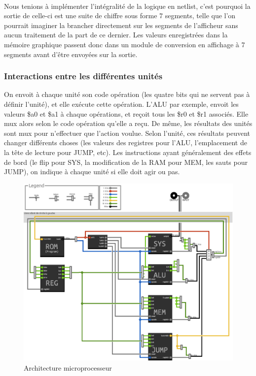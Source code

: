 \documentclass{article}
\begin{document}
\paragraph{}
Nous tenions à implémenter l'intégralité de la logique en netlist, c'est pourquoi
la sortie de celle-ci est une suite de chiffre sous forme 7 segments, telle que l'on
pourrait imaginer la brancher directement sur les segments de l'afficheur sans
aucun traitement de la part de ce dernier. Les valeurs enregistrées dans la mémoire
graphique passent donc dans un module de conversion en affichage à 7 segments avant
d'être envoyées sur la sortie.


\subsubsection{Interactions entre les différentes unités}

On envoit à chaque unité son code opération (les quatre bits qui ne servent pas
à définir l'unité), et elle exécute cette opération. L'ALU par exemple, envoit
les valeurs \$a0 et \$a1 à chaque opérations, et reçoit tous les \$r0 et \$r1
associés. Elle mux alors selon le code opération qu'elle a reçu. De même, les
résultats des unités sont mux pour n'effectuer que l'action voulue. Selon
l'unité, ces résultats peuvent changer différents choses (les valeurs des
registres pour l'ALU, l'emplacement de la tête de lecture pour JUMP, etc).
Les instructions ayant généralement des effets de bord (le flip pour SYS,
la modification de la RAM pour MEM, les sauts pour JUMP), on indique à chaque
unité si elle doit agir ou pas.\\

\begin{figure}[h]
\centering
\includegraphics{archi.eps}
\caption{\label{archi} Architecture microprocesseur}
\end{figure}
\end{document}
